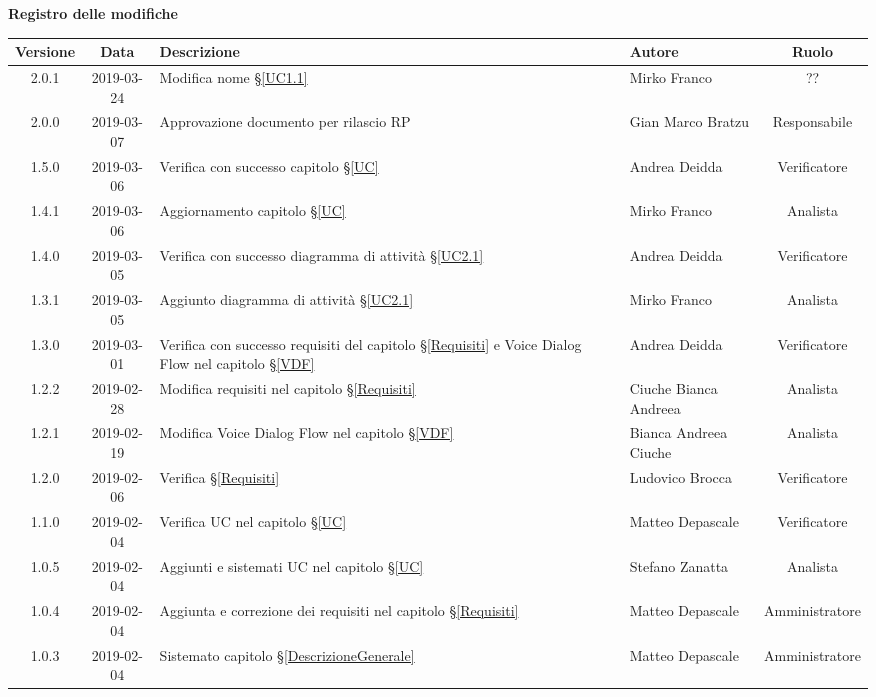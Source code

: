 	\begin{center}
		\textbf{Registro delle modifiche}
	\end{center}
	\begin{center}
		\begin{tabularx}{\textwidth}{|c|c|X|X|c|}
			\hline
			\textbf{Versione} & \textbf{Data} & \textbf{Descrizione} & \textbf{Autore} & \textbf{Ruolo} \\
			\hline
			2.0.1 & 2019-03-24 & Modifica nome \S\ref{UC1.1} & Mirko Franco & ?? \\
			\hline
			2.0.0 & 2019-03-07 & Approvazione documento per rilascio RP & Gian Marco Bratzu & Responsabile \\
			\hline
			1.5.0 & 2019-03-06 & Verifica con successo capitolo \S\ref{UC} &Andrea Deidda & Verificatore \\
			\hline
			1.4.1 & 2019-03-06 & Aggiornamento capitolo \S\ref{UC} & Mirko Franco & Analista \\
			\hline
			1.4.0 & 2019-03-05 & Verifica con successo diagramma di attività \S\ref{UC2.1} & Andrea Deidda & Verificatore \\
			\hline
			1.3.1 & 2019-03-05 & Aggiunto diagramma di attività \S\ref{UC2.1} & Mirko Franco & Analista \\
			\hline
			1.3.0 & 2019-03-01 & Verifica con successo requisiti del capitolo \S\ref{Requisiti} e Voice Dialog Flow nel capitolo \S\ref{VDF} & Andrea Deidda & Verificatore \\
			\hline
			1.2.2 & 2019-02-28 & Modifica requisiti nel capitolo \S\ref{Requisiti}& Ciuche Bianca Andreea & Analista \\
			\hline
			1.2.1 & 2019-02-19 & Modifica Voice Dialog Flow  nel capitolo \S\ref{VDF} & Bianca Andreea Ciuche & Analista  \\
			\hline
			1.2.0 & 2019-02-06 & Verifica \S\ref{Requisiti}& Ludovico Brocca & Verificatore \\
			\hline
			1.1.0 & 2019-02-04 & Verifica UC nel capitolo \S\ref{UC}& Matteo Depascale & Verificatore\\
			\hline
			1.0.5 & 2019-02-04 & Aggiunti e sistemati UC nel capitolo \S\ref{UC}& Stefano Zanatta & Analista\\
			\hline
			1.0.4 & 2019-02-04 & Aggiunta e correzione dei requisiti nel capitolo \S\ref{Requisiti}& Matteo Depascale & Amministratore\\
			\hline
			1.0.3 & 2019-02-04 & Sistemato capitolo \S\ref{DescrizioneGenerale}& Matteo Depascale & Amministratore\\

\end{tabularx}
\end{center}
